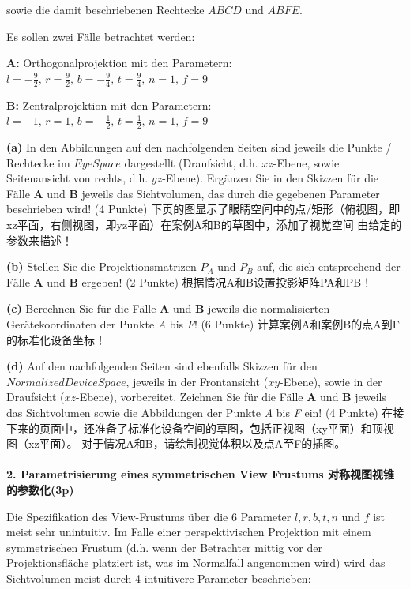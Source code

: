 \documentclass[fleqn]{article}
\begin{document}
sowie die damit beschriebenen Rechtecke $ABCD$ und $ABFE$.

Es sollen zwei Fälle betrachtet werden:

\textbf{A:} Orthogonalprojektion mit den Parametern: $l= -\frac{9}{2},\,r= \frac{9}{2},\,b= -\frac{9}{4},\,t= \frac{9}{4},\,n=1,\,f=9$

\textbf{B:} Zentralprojektion mit den Parametern: $l=-1,\,r=1,\,b=-\frac{1}{2},\,t=\frac{1}{2},\,n=1,\,f=9$

\indent\textbf{(a)} In den Abbildungen auf den nachfolgenden Seiten sind jeweils die Punkte / Rechtecke im $Eye Space$ dargestellt (Draufsicht, d.h. $xz$-Ebene, sowie Seitenansicht von rechts, d.h. $yz$-Ebene). Ergänzen Sie in den Skizzen für die Fälle \textbf{A} und \textbf{B} jeweils das Sichtvolumen, das durch die gegebenen Parameter beschrieben wird! (4 Punkte)
下页的图显示了眼睛空间中的点/矩形（俯视图，即xz平面，右侧视图，即yz平面）在案例A和B的草图中，添加了视觉空间 由给定的参数来描述！

\indent\textbf{(b)} Stellen Sie die Projektionsmatrizen $P_A$ und $P_B$ auf, die sich entsprechend der Fälle \textbf{A} und \textbf{B} ergeben! (2 Punkte)
根据情况A和B设置投影矩阵PA和PB！

\indent\textbf{(c)} Berechnen Sie für die Fälle \textbf{A} und \textbf{B} jeweils die normalisierten Gerätekoordinaten der Punkte \textit{A} bis \textit{F}! (6 Punkte)
计算案例A和案例B的点A到F的标准化设备坐标！

\indent\textbf{(d)} Auf den nachfolgenden Seiten sind ebenfalls Skizzen für den $Normalized Device Space$, jeweils in der Frontansicht ($xy$-Ebene), sowie in der Draufsicht ($xz$-Ebene), vorbereitet. Zeichnen Sie für die Fälle \textbf{A} und \textbf{B} jeweils das Sichtvolumen sowie die Abbildungen der Punkte \textit{A} bis \textit{F} ein! (4 Punkte)
在接下来的页面中，还准备了标准化设备空间的草图，包括正视图（xy平面）和顶视图（xz平面）。 对于情况A和B，请绘制视觉体积以及点A至F的插图。
\\
\\
\noindent\textbf{2. Parametrisierung eines symmetrischen View Frustums 对称视图视锥的参数化(3p)}

Die Spezifikation des View-Frustums über die 6 Parameter $l, r, b, t, n$ und $f$ ist meist sehr unintuitiv. Im Falle einer perspektivischen Projektion mit einem symmetrischen Frustum (d.h. wenn der Betrachter mittig vor der Projektionsfläche platziert ist, was im Normalfall angenommen wird) wird das Sichtvolumen meist durch 4 intuitivere Parameter beschrieben:
\end{document}
